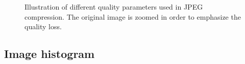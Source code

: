\begin{figure}[htbp]
 \centering
 \hfill
 
 \hfill
 
 \caption{Illustration of different quality parameters used in JPEG compression. The original image is zoomed in order to emphasize the quality loss.}
 \label{fig:introduction:matlab:lossy}
\end{figure}


\subsection{Image histogram}

